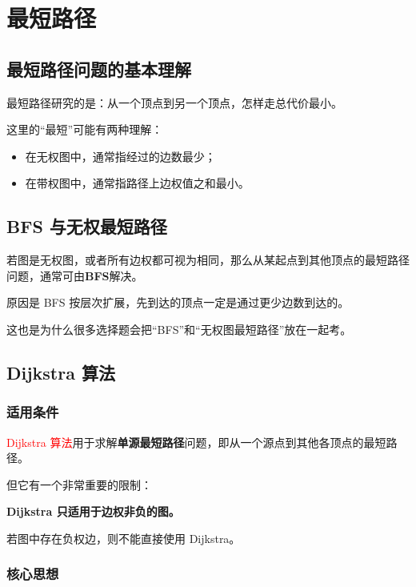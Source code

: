 \documentclass{../../note}
\begin{document}
\section{最短路径}

\subsection{最短路径问题的基本理解}

最短路径研究的是：从一个顶点到另一个顶点，怎样走总代价最小。

这里的“最短”可能有两种理解：

\begin{itemize}
  \item 在无权图中，通常指经过的边数最少；
  \item 在带权图中，通常指路径上边权值之和最小。
\end{itemize}

\subsection{BFS 与无权最短路径}

若图是无权图，或者所有边权都可视为相同，那么从某起点到其他顶点的最短路径问题，通常可由\textbf{BFS}解决。

原因是 BFS 按层次扩展，先到达的顶点一定是通过更少边数到达的。

这也是为什么很多选择题会把“BFS”和“无权图最短路径”放在一起考。

\subsection{Dijkstra 算法}

\subsubsection{适用条件}

\textcolor{red}{Dijkstra 算法}用于求解\textbf{单源最短路径}问题，即从一个源点到其他各顶点的最短路径。

但它有一个非常重要的限制：

\begin{center}
\textbf{Dijkstra 只适用于边权非负的图。}
\end{center}

若图中存在负权边，则不能直接使用 Dijkstra。

\subsubsection{核心思想}
\end{document}
